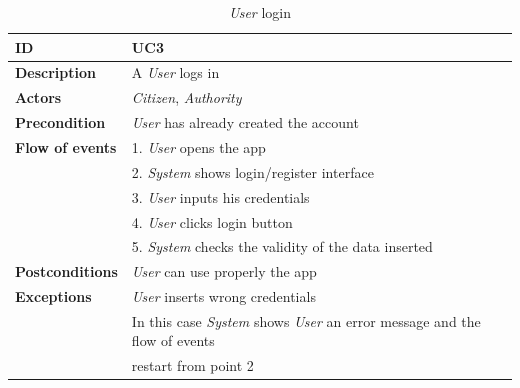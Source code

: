 \documentclass{article}
\begin{document}
\clearpage
\begin{table}
    \begin{center}
    \centering
\begin{tabular}{ | l | l |}
\hline
\textbf{ID} & UC3 \\
\hline
\textbf{Description} & A \textit{User} logs in  \\
\hline
\textbf{Actors} & \textit{Citizen}, \textit{Authority}\\
\hline
\textbf{Precondition} & \textit{User} has already created the account \\
\hline
\textbf{Flow of events} & 1. \textit{User} opens the app \\
                        & 2. \textit{System} shows login/register interface \\
                        & 3. \textit{User} inputs his credentials \\
                        & 4. \textit{User} clicks login button  \\
                        & 5. \textit{System} checks the validity of the data inserted \\
\hline
\textbf{Postconditions} & \textit{User} can use properly the app   \\
\hline
\textbf{Exceptions} & \textit{User} inserts wrong credentials \\
                    & In this case \textit{System} shows \textit{User} an error message and the flow of events  \\
                    & restart from point 2\\  
\hline
\end{tabular}
\caption{\textit{User} login}
\end{center}
\end{table}

\clearpage
\end{document}
